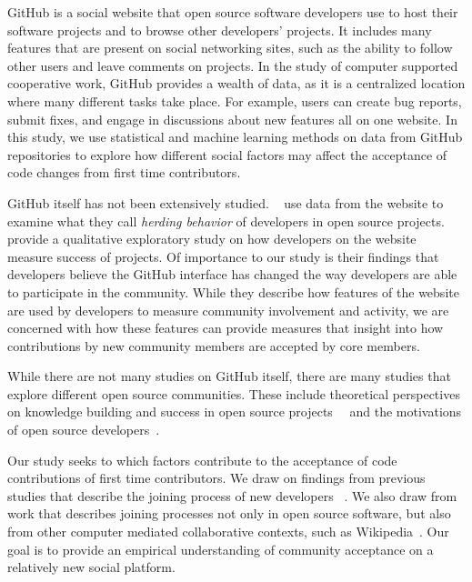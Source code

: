 \documentclass{iitthesis}
\begin{document}
\textpages     %


 \label{sec:github}
GitHub is a social website that open source software developers use to host
their software projects and to browse other developers' projects. It includes
many features that are present on social networking sites, such as the ability
to follow other users and leave comments on projects. In the study of computer
supported cooperative work, GitHub provides a wealth of data, as it is a
centralized location where many different tasks take place. For example, users
can create bug reports, submit fixes, and engage in discussions about new
features all on one website.  In this study, we use statistical and machine
learning methods on data from GitHub repositories to explore how different
social factors may affect the acceptance of code changes from first time
contributors.

GitHub itself has not been extensively studied. ~\cite{choi_herding_2013} use
data from the website to examine what they call \textit{herding behavior} of
developers in open source projects.  ~\cite{mcdonald_performance_2013} provide a
qualitative exploratory study on how developers on the website measure success
of projects. Of importance to our study is their findings that developers
believe the GitHub interface has changed the way developers are able to
participate in the community. While they describe how features of the website
are used by developers to measure community involvement and activity, we are
concerned with how these features can provide measures that insight into how
contributions by new community members are accepted by core members.

While there are not many studies on GitHub itself, there are many studies that
explore different open source communities. These include theoretical
perspectives on knowledge building and success in open source
projects~\cite{hemetsberger_learning_2006}~\cite{hemetsberger_collective_2009}
and the motivations of open source
developers~\cite{hertel_motivation_2003}\cite{lakhani_why_2003}.

Our study seeks to which factors contribute to the acceptance of code
contributions of first time contributors. We draw on findings from previous
studies that describe the joining process of new developers
~\cite{huang_mining_2005}\cite{von_krogh_community_2003}. We also draw from work
that describes joining processes not only in open source software, but also from
other computer mediated collaborative contexts, such as
Wikipedia~\cite{bryant_becoming_2005}. Our goal is to provide an empirical
understanding of community acceptance on a relatively new social platform.
\end{document}
